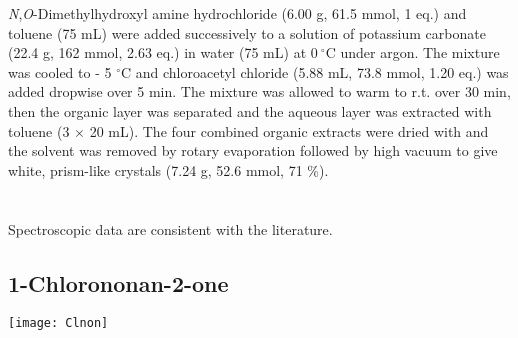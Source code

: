 {{{\textit{N},\textit{O}-Dimethylhydroxyl amine hydrochloride (6.00 g, 61.5 mmol, 1 eq.) and toluene (75 mL) were 
added successively to a solution of potassium carbonate (22.4 g, 162 mmol, 2.63 eq.) in water (75 mL) at $0\ ^{\circ}$C under argon. 
The mixture was cooled to - 5 $^{\circ}$C and chloroacetyl chloride (5.88 mL, 73.8 mmol, 1.20 eq.) was 
added dropwise over 5 min. The mixture was allowed to warm to r.t. over 30 min, 
then the organic layer was separated and the aqueous layer was extracted with toluene (3 $\times$ 20 mL). The 
four combined organic extracts were dried with  and the solvent was removed by rotary 
evaporation followed by high vacuum to give white, prism-like crystals (7.24 g, 52.6 mmol, 71 \%). 
\\[1\baselineskip]
\\[1\baselineskip]
\\[1\baselineskip]
Spectroscopic data are consistent with the literature\cite{Hodgkinson2011}.


\subsection{1-Chlorononan-2-one }


\begin{scheme}[H]
	\begin{center}
		\texttt{[image: Clnon]}
	\end{center}
\end{scheme}

}}}

